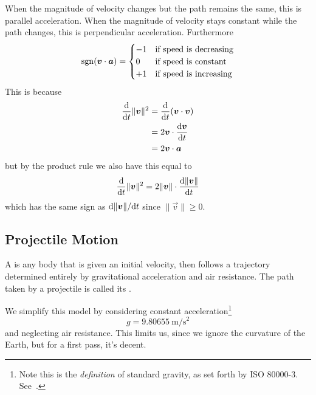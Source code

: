 When the magnitude of velocity changes but the path remains the same,
this is parallel acceleration. When the magnitude of velocity stays
constant while the path changes, this is perpendicular
acceleration. Furthermore
\begin{equation}
\sgn(\vec{v}\cdot\vec{a})=\begin{cases}
-1 & \mbox{if speed is decreasing}\\
0 & \mbox{if speed is constant}\\
+1 & \mbox{if speed is increasing}
\end{cases}
\end{equation}
This is because
\begin{equation}
\begin{split}
\frac{\D}{\D t}\|\vec{v}\|^{2}
&=\frac{\D}{\D t}(\vec{v}\cdot\vec{v})\\
&=2\vec{v}\cdot\frac{\D\vec{v}}{\D t}\\
&=2\vec{v}\cdot\vec{a}
\end{split}
\end{equation}
but by the product rule we also have this equal to
\begin{equation}
\frac{\D}{\D t}\|\vec{v}\|^{2}=2\|\vec{v}\|\cdot\frac{\D\|\vec{v}\|}{\D t}
\end{equation}
which has the same sign as $\D\|\vec{v}\|/\D t$ since
$\|\vec{v}\|\geq0$. 

\subsection{Projectile Motion}
A  is any body that is given an initial velocity,
then follows a trajectory determined entirely by gravitational
acceleration and air resistance. The path taken by a projectile is
called its .

\begin{remark}
We simplify this model by considering constant
acceleration\footnote{Note this is the \emph{definition} of standard
  gravity, as set forth by ISO 80000-3. See~\cite[p 52]{sp330}.}
\begin{equation}
g=\SI{9.80655}{\meter/\square\second} 
\end{equation}
and neglecting air resistance. This limits us, since we ignore the
curvature of the Earth, but for a first pass, it's decent.
\end{remark}

